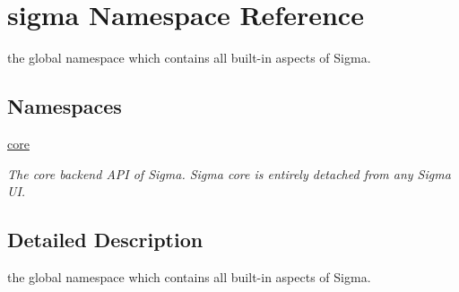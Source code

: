 \hypertarget{namespacesigma}{}\section{sigma Namespace Reference}
\label{namespacesigma}


the global namespace which contains all built-\/in aspects of Sigma.  


\subsection*{Namespaces}
\begin{DoxyCompactItemize}
\item 
 \hyperlink{namespacesigma_1_1core}{core}
\begin{DoxyCompactList}\small\item\em The core backend A\+P\+I of Sigma. Sigma core is entirely detached from any Sigma U\+I. \end{DoxyCompactList}\end{DoxyCompactItemize}


\subsection{Detailed Description}
the global namespace which contains all built-\/in aspects of Sigma. 